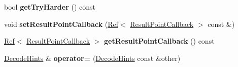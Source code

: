 \begin{DoxyCompactItemize}
bool {\bfseries get\+Try\+Harder} () const
\item 
\mbox{\label{classzxing_1_1_decode_hints_a59f11b4c3e813eef0355f12a76d0b8e1}} 
void {\bfseries set\+Result\+Point\+Callback} (\mbox{\hyperlink{classzxing_1_1_ref}{Ref}}$<$ \mbox{\hyperlink{classzxing_1_1_result_point_callback}{Result\+Point\+Callback}} $>$ const \&)
\item 
\mbox{\label{classzxing_1_1_decode_hints_a668397b4b3889e3c06e5c160c4be802f}} 
\mbox{\hyperlink{classzxing_1_1_ref}{Ref}}$<$ \mbox{\hyperlink{classzxing_1_1_result_point_callback}{Result\+Point\+Callback}} $>$ {\bfseries get\+Result\+Point\+Callback} () const
\item 
\mbox{\label{classzxing_1_1_decode_hints_a308b25a377e9c3c3e6e509011e453480}} 
\mbox{\hyperlink{classzxing_1_1_decode_hints}{Decode\+Hints}} \& {\bfseries operator=} (\mbox{\hyperlink{classzxing_1_1_decode_hints}{Decode\+Hints}} const \&other)
\end{DoxyCompactItemize}
